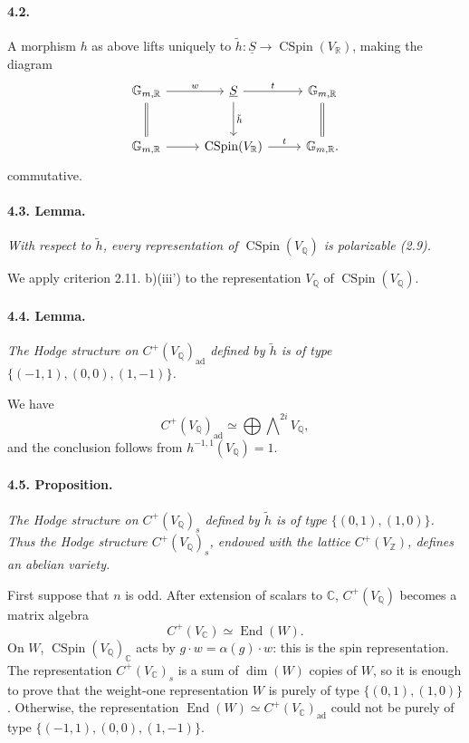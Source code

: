 \documentclass[10pt,leqno]{article}
\newcommand{\C}{\mathbb{C}}
\newcommand{\Q}{\mathbb{Q}}
\newcommand{\R}{\mathbb{R}}
\newcommand{\Z}{\mathbb{Z}}
\newcommand{\End}{\operatorname{End}}
\newcommand{\CSpin}{\operatorname{CSpin}}
\newcommand{\ad}{\operatorname{ad}}
\begin{document}
\paragraph{4.2.} A morphism $h$ as above lifts uniquely to $\tilde h:\underline S\to\CSpin(V_\R)$, making the diagram
\[
\begin{tikzcd}[column sep=2.6em,row sep=2.6em]
\mathbb G_{m,\R} \arrow[r,"w"] \arrow[d,equal] & \underline S \arrow[r,"t"] \arrow[d,"\tilde h"] & \mathbb G_{m,\R} \arrow[d,equal]\\
\mathbb G_{m,\R} \arrow[r] & \CSpin(V_\R) \arrow[r,"t"] & \mathbb G_{m,\R}.
\end{tikzcd}
\]
commutative.

\clearpage

\paragraph{4.3. Lemma.} \emph{With respect to $\tilde h$, every representation of $\CSpin(V_\Q)$ is polarizable (2.9).}

We apply criterion 2.11. b)(iii') to the representation $V_\Q$ of $\CSpin(V_\Q)$.

\paragraph{4.4. Lemma.} \emph{The Hodge structure on $C^+(V_\Q)_{\ad}$ defined by $\tilde h$ is of type $\{(-1,1),(0,0),(1,-1)\}$.}

We have
\[
C^+(V_\Q)_{\ad}\simeq\bigoplus\bigwedge\nolimits^{2i}V_\Q,
\]
and the conclusion follows from $h^{-1,1}(V_\Q)=1$.

\paragraph{4.5. Proposition.} \emph{The Hodge structure on $C^+(V_\Q)_s$ defined by $\tilde h$ is of type $\{(0,1),(1,0)\}$. Thus the Hodge structure $C^+(V_\Q)_s$, endowed with the lattice $C^+(V_\Z)$, defines an abelian variety.}

First suppose that $n$ is odd. After extension of scalars to $\C$, $C^+(V_\Q)$ becomes a matrix algebra
\[
C^+(V_\C)\simeq\End(W).
\]
On $W$, $\CSpin(V_\Q)_\C$ acts by $g\cdot w=\alpha(g)\cdot w$: this is the spin representation. The representation $C^+(V_\C)_s$ is a sum of $\dim(W)$ copies of $W$, so it is enough to prove that the weight-one representation $W$ is purely of type $\{(0,1),(1,0)\}$. Otherwise, the representation $\End(W)\simeq C^+(V_\C)_{\ad}$ could not be purely of type $\{(-1,1),(0,0),(1,-1)\}$.
\end{document}
